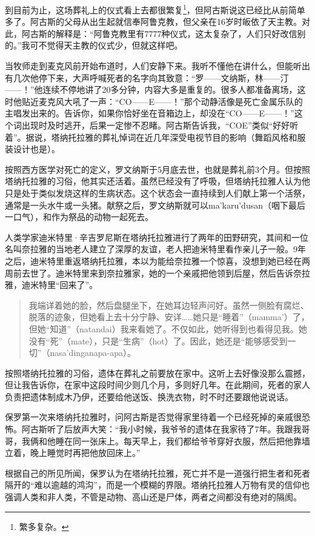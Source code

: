 \documentclass[12pt,oneside]{book}
\begin{document}
到目前为止，这场葬礼上的仪式看上去都很繁复\footnote{繁多复杂。}，但阿古斯说这已经比从前简单多了。阿古斯的父母从出生起就信奉阿鲁克教，但父亲在16岁时皈依了天主教。对此，阿古斯的解释是：“阿鲁克教里有7777种仪式，这太复杂了，人们只好改信别的。”我可不觉得天主教的仪式少，但就这样吧。

当牧师走到麦克风前开始布道时，人们安静下来。我听不懂他在讲什么，但能听出有几次他停下来，大声呼喊死者的名字向其致意：“罗——文纳斯，林——汀——！”他连续不停地讲了20多分钟，内容大多是重复的。很多人都准备离场，这时他贴近麦克风大吼了一声：“CO——E——！”那个动静活像是死亡金属乐队的主唱发出来的。告诉你，如果你恰好坐在音箱边上，却没在“CO——E——！”这个词出现时及时逃开，后果一定惨不忍睹。阿古斯告诉我，“COE”类似“好好听着”。据说，塔纳托拉雅的葬礼悼词在近几年深受电视节目的影响（舞蹈风格和服装设计也是）。

按照西方医学对死亡的定义，罗文纳斯于5月底去世，也就是葬礼前3个月。但按照塔纳托拉雅的习俗，他其实还活着。虽然已经没有了呼吸，但塔纳托拉雅人认为他只是处于类似发烧这样的生病状态。这个状态会一直持续到人们献上第一个活祭，通常是一头水牛或一头猪。献祭之后，罗文纳斯就可以ma’karu’dusan（咽下最后一口气），和作为祭品的动物一起死去。

人类学家迪米特里·辛吉罗尼斯在塔纳托拉雅进行了两年的田野研究，其间和一位名叫奈拉雅的当地老人建立了深厚的友谊，老人把迪米特里看作亲儿子一般。9年之后，迪米特里重返塔纳托拉雅，本以为能给奈拉雅一个惊喜，没想到她已经在两周前去世了。迪米特里来到奈拉雅家，她的一个亲戚把他领到后屋，然后告诉奈拉雅，迪米特里“回来了”。

\begin{quotation}
我端详着她的脸，然后盘腿坐下，在她耳边轻声问好。虽然一侧脸有腐烂、脱落的迹象，但她看上去十分宁静、安详……她只是“睡着”（mamma’）了，但她“知道”（natandai）我来看她了。不仅如此，她听得到也看得见我。她没有“死”（mate），只是“生病”（hot）了。因此，她还是“能够感受到一切”（nasa’dinganapa-apa）。
\end{quotation}

按照塔纳托拉雅的习俗，遗体在葬礼之前要放在家中。这听上去好像没那么震撼，但让我告诉你，在家中这段时间少则几个月，多则好几年。在此期间，死者的家人负责把遗体制成木乃伊，还要给他送饭、换洗衣物，时不时还要跟他说说话。

保罗第一次来塔纳托拉雅时，问阿古斯是否觉得家里待着一个已经死掉的亲戚很恐怖。阿古斯听了后放声大笑：“我小时候，我爷爷的遗体在我家待了7年。我跟我哥哥，我俩和他睡在同一张床上。每天早上，我们都给爷爷穿好衣服，然后把他靠墙立着，晚上睡觉时再把他放回床上。”

根据自己的所见所闻，保罗认为在塔纳托拉雅，死亡并不是一道强行把生者和死者隔开的“难以逾越的鸿沟”，而是一个模糊的界限。塔纳托拉雅人万物有灵的信仰也强调人类和非人类，不管是动物、高山还是尸体，两者之间都没有绝对的隔阂。
\end{document}
